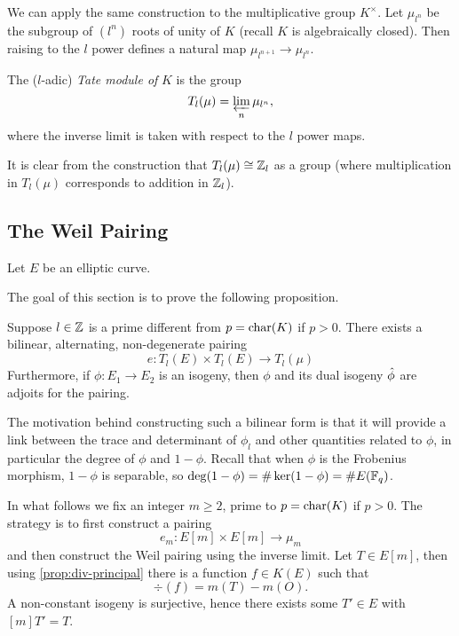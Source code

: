We can apply the same construction to the multiplicative group $K^\times$.
Let $\mu_{l^n}$ be the subgroup of $(l^n)$ roots of unity of $K$
(recall $K$ is algebraically closed). Then raising to the $l$
power defines a natural map $\mu_{l^{n+1}} \to \mu_{l^n}$.


\begin{definition}
	The ($l$-adic) \emph{Tate module of} $K$ is the group
	\begin{equation*}
		T_l(\mu) = \varprojlim_n \mu_{l^n},
	\end{equation*}
	where the inverse limit is taken with respect to the $l$
	power maps.
\end{definition}

It is clear from the construction that $T_l(\mu) \cong \mathbb{Z}_l$ as a group
(where multiplication in $T_l(\mu)$ corresponds to addition in
$\mathbb{Z}_l$).

\subsection{The Weil Pairing}

Let $E$ be an elliptic curve. 


The goal of this section is to prove the following proposition.
\begin{proposition}
	\label{prop:weil-pairing}
	Suppose $l \in \mathbb{Z}$ is a prime different from $p = \operatorname{char}(K)$ if $p > 0$.
	There exists a bilinear, alternating, non-degenerate pairing
	\begin{equation*}
		e: T_l(E) \times T_l(E) \to T_l(\mu)	
	\end{equation*}
	Furthermore, if $\phi: E_1 \to E_2$ is an isogeny, then $\phi$ and its
	dual isogeny $\Hat\phi$ are adjoits for the pairing.
\end{proposition}
The motivation behind constructing such a bilinear form is that it will provide
a link between the trace and determinant of $\phi_l$ and other quantities
related to $\phi$, in particular the degree of $\phi$ and $1 - \phi$.
Recall that when $\phi$ is the Frobenius morphism, $1 - \phi$ is separable,
so $\deg(1 - \phi) = \#\ker(1 - \phi) = \#E(\mathbb{F}_q)$.

In what follows we fix an integer $m \geq 2$,
prime to $p = \operatorname{char}(K)$ if $p > 0$.
The strategy is to first construct a pairing
\begin{equation*}
	e_m: E[m] \times E[m] \to \mu_m
\end{equation*}
and then construct the Weil pairing using the inverse limit.
Let $T \in E[m]$, then using \ref{prop:div-principal}
there is a function $f \in K(E)$ such that
\begin{equation*}
	\div(f) = m(T) - m(O).
\end{equation*}
A non-constant isogeny is surjective, hence there exists some $T' \in E$
with $[m]T' = T$. 

